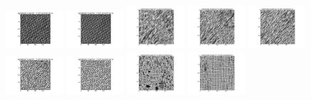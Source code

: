 \documentclass{extarticle}
\theoremstyle{definition}
\theoremstyle{definition}
\begin{document}
\begin{figure}[H]
	\includegraphics[width = 0.19\textwidth]{./figures/Syth_T2_size_15.png}
	\includegraphics[width = 0.19\textwidth]{./figures/Syth_T2_size_23.png}
	\includegraphics[width = 0.19\textwidth]{./figures/Syth_T3_size_5.png}
	\includegraphics[width = 0.19\textwidth]{./figures/Syth_T3_size_9.png}
	\includegraphics[width = 0.19\textwidth]{./figures/Syth_T3_size_11.png}	
	\includegraphics[width = 0.19\textwidth]{./figures/Syth_T3_size_15.png}	
	\includegraphics[width = 0.19\textwidth]{./figures/Syth_T3_size_23.png}
	\includegraphics[width = 0.19\textwidth]{./figures/Syth_T4_size_5.png}
	\includegraphics[width = 0.19\textwidth]{./figures/Syth_T4_size_9.png}

\end{figure}
\end{document}
